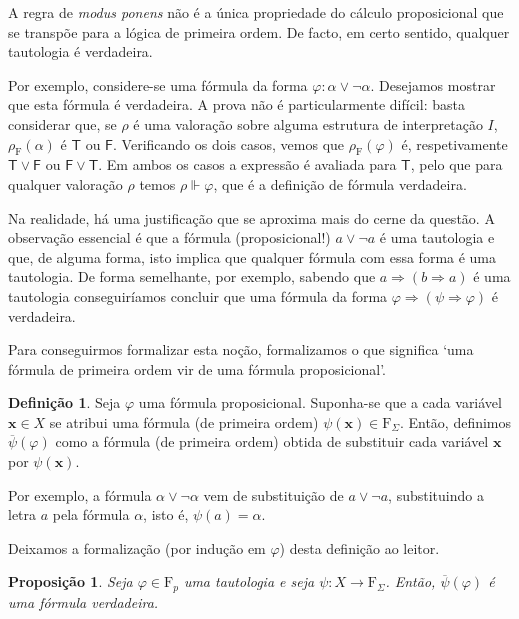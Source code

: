 \documentclass{report}
\newtheorem{prop}{Proposição}
\theoremstyle{definition}
\newtheorem{definicao}{Definição}
\theoremstyle{remark}
\renewcommand{\bf}[1]{\mathbf{#1}}
\newcommand{\F}{\mathrm{F}}
\newcommand{\lt}{\mathsf{T}}
\newcommand{\lf}{\mathsf{F}}
\newcommand{\imply}{\mathbin{\Rightarrow}}
\begin{document}
	A regra de \emph{modus ponens} não é a única propriedade do cálculo proposicional que se transpõe para a lógica de primeira ordem. De facto, em certo sentido, qualquer tautologia é verdadeira.
	
	Por exemplo, considere-se uma fórmula da forma $\varphi : \alpha \lor \neg \alpha$. Desejamos mostrar que esta fórmula é verdadeira. A prova não é particularmente difícil: basta considerar que, se $\rho$ é uma valoração sobre alguma estrutura de interpretação $I$, $\rho_\F(\alpha)$ é $\lt$ ou $\lf$. Verificando os dois casos, vemos que $\rho_\F(\varphi)$ é, respetivamente $\lt \lor \lf$ ou $\lf \lor \lt$. Em ambos os casos a expressão é avaliada para $\lt$, pelo que para qualquer valoração $\rho$ temos $\rho \Vdash \varphi$, que é a definição de fórmula verdadeira.
	
	Na realidade, há uma justificação que se aproxima mais do cerne da questão. A observação essencial é que a fórmula (proposicional!) $a \lor \neg a$ é uma tautologia e que, de alguma forma, isto implica que qualquer fórmula com essa forma é uma tautologia. De forma semelhante, por exemplo, sabendo que $a \imply (b \imply a)$ é uma tautologia conseguiríamos concluir que uma fórmula da forma $\varphi \imply (\psi \imply \varphi)$ é verdadeira.
	
	Para conseguirmos formalizar esta noção, formalizamos o que significa `uma fórmula de primeira ordem vir de uma fórmula proposicional'.
	
	\begin{definicao}
	Seja $\varphi$ uma fórmula proposicional. Suponha-se que a cada variável $\bf x \in X$ se atribui uma fórmula (de primeira ordem) $\psi(\bf x) \in \F_\Sigma$. Então, definimos $\overline\psi(\varphi)$ como a fórmula (de primeira ordem) obtida de substituir cada variável $\bf x$ por $\psi(\bf x)$.
	
	Por exemplo, a fórmula $\alpha \lor \neg \alpha$ vem de substituição de $a \lor \neg a$, substituindo a letra $a$ pela fórmula $\alpha$, isto é, $\psi(a) = \alpha$.
	
	Deixamos a formalização (por indução em $\varphi$) desta definição ao leitor.
	\end{definicao}
	
	\begin{prop}\label{fol:tautoistheo}
	Seja $\varphi \in \F_p$ uma tautologia e seja $\psi : X \to \F_\Sigma$. Então, $\overline\psi(\varphi)$ é uma fórmula verdadeira.
	\end{prop}
	
\end{document}
